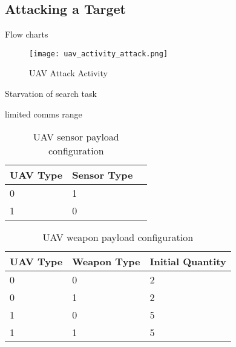 \subsection{Attacking a Target}

Flow charts
\begin{figure}[h]
	\centering
	\texttt{[image: uav\_activity\_attack.png]}
	\caption{UAV Attack Activity}
	\label{fig:uavAttackActivity}
\end{figure}



Starvation of search task

limited comms range

\begin{table}[h]
	\caption{UAV sensor payload configuration}
	\centering
	\label{tab:uavSensorMap}
	\begin{tabular}{|p{1cm}|p{1cm}|p{1cm}|}
		\hline
		UAV Type & Sensor Type\\ \hline
		0 & 1 \\
		1 & 0 \\
		\hline
	\end{tabular}
\end{table}


\begin{table}[h]
	\caption{UAV weapon payload configuration}
	\centering
	\label{tab:uavWpnMap}
	\begin{tabular}{|p{1cm}|p{1.5cm}|p{2cm}|}
		\hline
		UAV Type & Weapon Type & Initial Quantity\\ \hline
		0 & 0 & 2 \\
		0 & 1 & 2 \\
		1 & 0 & 5 \\
		1 & 1 & 5 \\
		\hline
	\end{tabular}
\end{table}
